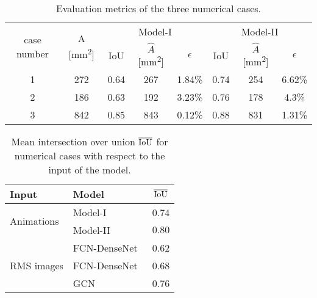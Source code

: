 \begin{sloppypar}
\begin{table}[ht!]
		\caption{Evaluation metrics of the three numerical cases.}
		\begin{tabular}{cccccccc}
			\toprule
			\multirow{2}{*}{case number} & \multicolumn{1}{c}{\multirow{2}{*}{A [mm\textsuperscript{2}]}} & \multicolumn{3}{c}{Model-I} & \multicolumn{3}{c}{Model-II} \\ \cmidrule(lr){3-5} \cmidrule(lr){6-8} 
			& \multicolumn{1}{c}{}  & \multicolumn{1}{c}{IoU}  & \multicolumn{1}{c}{\(\hat{A}\) [mm\textsuperscript{2}]} & \(\epsilon\) & \multicolumn{1}{c}{IoU}  & \multicolumn{1}{c}{\(\hat{A}\) [mm\textsuperscript{2}]} & \(\epsilon\) \\ 
			\midrule
			1 & 272 & \multicolumn{1}{c}{0.64} & \multicolumn{1}{c}{267} & 1.84\% & \multicolumn{1}{c}{0.74} & \multicolumn{1}{c}{254} & 6.62\% \\ 
			2 &  186  & \multicolumn{1}{c}{0.63} & \multicolumn{1}{c}{192} & 3.23\% & \multicolumn{1}{c}{0.76} & \multicolumn{1}{c}{178} & 4.3\% \\ 
			3 & 842 & \multicolumn{1}{c}{0.85} &\multicolumn{1}{c}{843} & 0.12\%   & \multicolumn{1}{c}{0.88} & \multicolumn{1}{c}{831} & 1.31\% \\ 
			\bottomrule
		\end{tabular}	
		\label{tab:num_cases}
	\end{table}

	\begin{table}[ht!]
		\centering
		\caption{Mean intersection over union $\overline{\textup{IoU}}$ for numerical cases with respect to the input of the model.}
		\begin{tabular}{llc}
			\toprule
			Input & Model & $\overline{\textup{IoU}}$ \\ 
			\midrule
			\multirow{2}{*}{Animations} & Model-I & 0.74 \\ & Model-II                    & \(0.80\)    \\ \midrule
			\multirow{3}{*}{RMS images}  & FCN-DenseNet~\cite{Ijjeh2021} & 0.62     \\
			& FCN-DenseNet~\cite{Ijjeh2022} & 0.68     \\
			& GCN~\cite{Ijjeh2022}          & 0.76     \\ 
			\bottomrule
		\end{tabular}
		\label{tab:meanIoU_vs_input}
	\end{table}

	
	\clearpage

\end{sloppypar}
